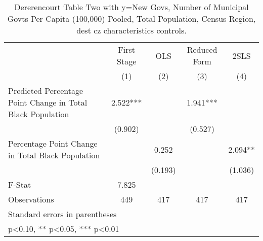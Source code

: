 \begin{table}[htbp]\centering
\def\sym#1{\ifmmode^{#1}\else\(^{#1}\)\fi}
\caption{Dererencourt Table Two with y=New Govs, Number of Municipal Govts Per Capita (100,000) Pooled, Total Population, Census Region, dest cz characteristics controls.}
\begin{tabular}{l*{4}{c}}
\toprule
                    & First Stage   &         OLS   &Reduced Form   &        2SLS   \\
                    &\multicolumn{1}{c}{(1)}   &\multicolumn{1}{c}{(2)}   &\multicolumn{1}{c}{(3)}   &\multicolumn{1}{c}{(4)}   \\
\midrule
Predicted Percentage Point Change in Total Black Population&       2.522***&               &       1.941***&               \\
                    &     (0.902)   &               &     (0.527)   &               \\
\addlinespace
Percentage Point Change in Total Black Population&               &       0.252   &               &       2.094** \\
                    &               &     (0.193)   &               &     (1.036)   \\
\midrule
F-Stat              &       7.825   &               &               &               \\
Observations        &         449   &         417   &         417   &         417   \\
\bottomrule
\multicolumn{5}{l}{\footnotesize Standard errors in parentheses}\\
\multicolumn{5}{l}{\footnotesize * p<0.10, ** p<0.05, *** p<0.01}\\
\end{tabular}
\end{table}
